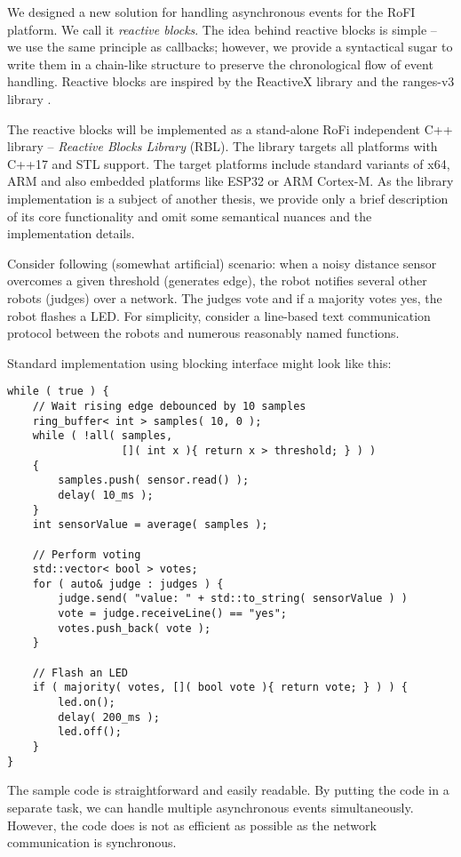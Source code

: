We designed a new solution for handling asynchronous events for the RoFI
platform. We call it \emph{reactive blocks}. The idea behind reactive blocks is
simple -- we use the same principle as callbacks; however, we provide a
syntactical sugar to write them in a chain-like structure to preserve the
chronological flow of event handling. Reactive blocks are inspired by the
ReactiveX library \cite{noauthor_reactivex_nodate} and the ranges-v3 library
\cite{noauthor_range-v3_nodate}.

The reactive blocks will be implemented as a stand-alone RoFi independent C++
library -- \emph{Reactive Blocks Library} (RBL). The library targets all
platforms with C++17 and STL support. The target platforms include standard
variants of x64, ARM and also embedded platforms like ESP32 or ARM Cortex-M. As
the library implementation is a subject of another thesis, we provide only a
brief description of its core functionality and omit some semantical nuances and
the implementation details.

Consider following (somewhat artificial) scenario: when a noisy distance sensor
overcomes a given threshold (generates edge), the robot notifies several other
robots (judges) over a network. The judges vote and if a majority votes yes, the
robot flashes a LED. For simplicity, consider a line-based text communication
protocol between the robots and numerous reasonably named functions.

Standard implementation using blocking interface might look like this:
\begin{verbatim}
while ( true ) {
    // Wait rising edge debounced by 10 samples
    ring_buffer< int > samples( 10, 0 );
    while ( !all( samples,
                  []( int x ){ return x > threshold; } ) )
    {
        samples.push( sensor.read() );
        delay( 10_ms );
    }
    int sensorValue = average( samples );

    // Perform voting
    std::vector< bool > votes;
    for ( auto& judge : judges ) {
        judge.send( "value: " + std::to_string( sensorValue ) )
        vote = judge.receiveLine() == "yes";
        votes.push_back( vote );
    }

    // Flash an LED
    if ( majority( votes, []( bool vote ){ return vote; } ) ) {
        led.on();
        delay( 200_ms );
        led.off();
    }
}
\end{verbatim}

The sample code is straightforward and easily readable. By putting the code in a
separate task, we can handle multiple asynchronous events simultaneously.
However, the code does is not as efficient as possible as the network
communication is synchronous.

